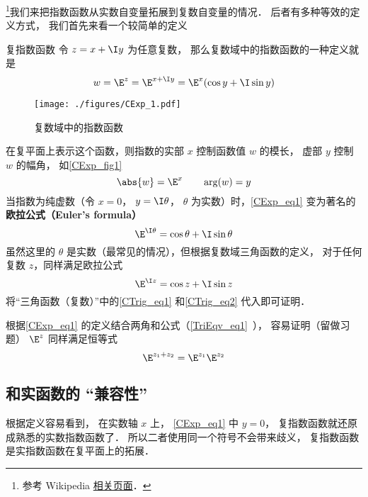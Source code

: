 


\footnote{参考 Wikipedia \href{https://en.wikipedia.org/wiki/Euler's_formula}{相关页面}．}我们来把指数函数从实数自变量拓展到复数自变量的情况． 后者有多种等效的定义方式， 我们首先来看一个较简单的定义

\begin{definition}{复指数函数}
令 $z = x + \I y$ 为任意复数， 那么复数域中的指数函数的一种定义就是
\begin{equation}\label{CExp_eq1}
w = \E^z = \E^{x + \I y} = \E^x(\cos y + \I\sin y)
\end{equation}
\end{definition}

\begin{figure}[ht]
\centering
\texttt{[image: ./figures/CExp\_1.pdf]}
\caption{复数域中的指数函数} \label{CExp_fig1}
\end{figure}

在复平面上表示这个函数，则指数的实部 $x$ 控制函数值 $w$ 的模长， 虚部 $y$ 控制 $w$ 的幅角， 如\autoref{CExp_fig1}
 \begin{equation}
\abs{w} = \E^x \qquad \arg(w) = y
\end{equation}
当指数为纯虚数（令 $x = 0$， $y = \I\theta$， $\theta$ 为实数）时，\autoref{CExp_eq1} 变为著名的\textbf{欧拉公式（Euler's formula）}
\begin{equation}\label{CExp_eq2}
\E^{\I \theta} = \cos \theta + \I\sin \theta
\end{equation}
虽然这里的 $\theta$ 是实数（最常见的情况），但根据复数域三角函数的定义， 对于任何复数 $z$，同样满足欧拉公式
\begin{equation}
\E^{\I z} = \cos z + \I\sin z
\end{equation}
将“三角函数（复数）”中的\autoref{CTrig_eq1} 和\autoref{CTrig_eq2} 代入即可证明．

根据\autoref{CExp_eq1} 的定义结合两角和公式（\autoref{TriEqv_eq1}~）， 容易证明（留做习题） $\E^z$ 同样满足恒等式
\begin{equation}
\E^{z_1 + z_2} = \E^{z_1}\E^{z_2}
\end{equation}

\subsection{和实函数的 “兼容性”}
根据定义容易看到， 在实数轴 $x$ 上， \autoref{CExp_eq1} 中 $y = 0$， 复指数函数就还原成熟悉的实数指数函数了． 所以二者使用同一个符号不会带来歧义， 复指数函数是实指数函数在复平面上的拓展．

